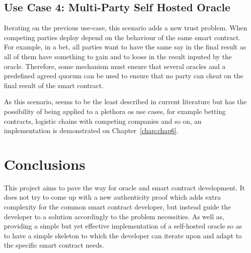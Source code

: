 \subsection{Use Case 4: Multi-Party Self Hosted Oracle}

Iterating on the previous use-case, this scenario adds a new trust problem. When competing parties deploy depend on the behaviour of the same smart contract. For example, in a bet, all parties want to have the same say in the final result as all of them have something to gain and to loose in the result inputed by the oracle. Therefore, some mechanism must ensure that several oracles and a predefined agreed quorum can be used to ensure that no party can cheat on the final result of the smart contract.

As this scenario, seems to be the least described in current literature but has the possibility of being applied to a plethora os use cases, for example betting contracts, logistic chains with competing companies and so on, an implementation is demonstrated on Chapter~\ref{chap:chap6}.


\section{Conclusions}
This project aims to pave the way for oracle and smart contract development. It does not try to come up with a new authenticity proof which adds extra complexity for the common smart contract developer, but instead guide the developer to a solution accordingly to the problem necessities. As well as, providing a simple but yet effective implementation of a self-hosted oracle so as to have a simple skeleton to which the developer can iterate upon and adapt to the specific smart contract needs.